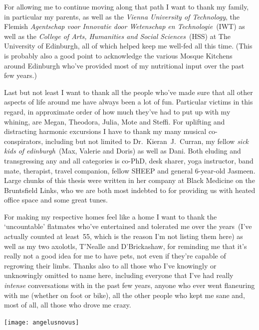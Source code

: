 \documentclass[twoside,10pt]{book}
\begin{document}
For allowing me to continue moving along that path I want to thank my family, in particular my parents, as well as the \emph{Vienna University of Technology}, the Flemish \emph{Agentschap voor Innovatie door Wetenschap en Technologie}~(IWT) as well as the \emph{College of Arts, Humanities and Social Sciences}~(HSS) at The University of Edinburgh, all of which helped keep me well-fed all this time. (This is probably also a good point to acknowledge the various Mosque Kitchens around Edinburgh who've provided most of my nutritional input over the past few years.)

Last but not least I want to thank all the people who've made sure that all other aspects of life around me have always been a lot of fun. Particular victims in this regard, in approximate order of how much they've had to put up with my whining, are Megan, Theodora, Julia, Mote and Steffi.
For uplifting and distracting harmonic excursions I have to thank my many musical co-conspirators, including but not limited to Dr.~Kieran~J.~Curran, my fellow \emph{sick kids of edinburgh}~(Max, Valerie and Doris) as well as Dani.
Both eluding and transgressing any and all categories is co-PhD, desk sharer, yoga instructor, band mate, therapist, travel companion, fellow SHEEP and general 6-year-old Jasmeen. Large chunks of this thesis were written in her company at Black Medicine on the Bruntsfield Links, who we are both most indebted to for providing us with heated office space and some great tunes.

For making my respective homes feel like a home I want to thank the `uncountable' flatmates who've entertained and tolerated me over the years~(I've actually counted at least~55, which is the reason I'm not listing them here) as well as my two axolotls, T'Nealle and D'Brickashaw, for reminding me that it's really not a good idea for me to have pets, not even if they're capable of regrowing their limbs. %
Thanks also to all those who I've knowingly or unknowingly omitted to name here, including everyone that I've had really \emph{intense} conversations with in the past few years, anyone who ever went flaneuring with me (whether on foot or bike), all the other people who kept me sane and, most of all, all those who drove me crazy.
\vfill
\begin{center}
\texttt{[image: angelusnovus]}\\
\end{center}
\end{document}
